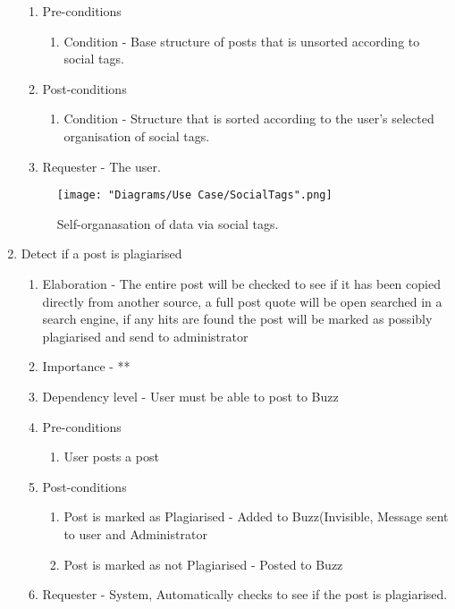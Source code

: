 \documentclass[12pt]{article}
\begin{document}
\begin{enumerate}
\begin{enumerate}
    \item Pre-conditions
    \begin{enumerate}
    	\item Condition - Base structure of posts that is unsorted according to social tags.
    \end{enumerate}
        \item Post-conditions
    \begin{enumerate}
    	\item Condition - Structure that is sorted according to the user's selected organisation of social tags.
    \end{enumerate}
    \item Requester - The user.
  \end{enumerate}
\clearpage %
    \begin{figure}[h]
    	\centering
    	\texttt{[image: "Diagrams/Use Case/SocialTags".png]}
    	\caption{Self-organasation of data via social tags.}
    \end{figure}
\newpage %
   \item Detect if a post is plagiarised  %
  \begin{enumerate}
    \item Elaboration - The entire post will be checked to see if it has been copied directly from another source, a full post quote will be open searched in a search engine, if any hits are found the post will be marked as possibly plagiarised and send to administrator
    \item Importance - **
    \item Dependency level - User must be able to post to Buzz
    \item Pre-conditions
    \begin{enumerate}
    	\item User posts a post
    \end{enumerate}
        \item Post-conditions
    \begin{enumerate}
    	\item Post is marked as Plagiarised - Added to Buzz(Invisible, Message sent to user and Administrator
    	\item Post is marked as not Plagiarised - Posted to Buzz
    \end{enumerate}
    \item Requester - System, Automatically checks to see if the post is plagiarised.

\end{enumerate}
\end{enumerate}
\end{document}
